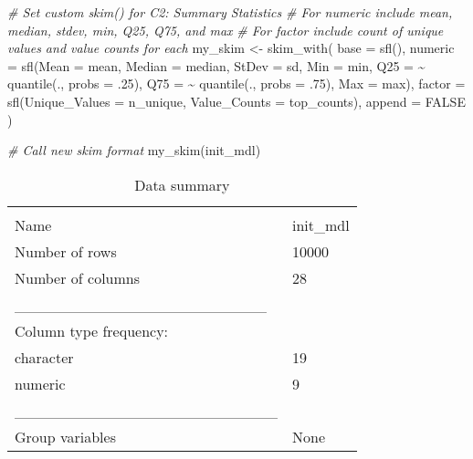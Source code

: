 \documentclass[
]{article}
\newenvironment{Shaded}{\begin{snugshade}}{\end{snugshade}}
\newcommand{\AttributeTok}[1]{\textcolor[rgb]{0.77,0.63,0.00}{#1}}
\newcommand{\CommentTok}[1]{\textcolor[rgb]{0.56,0.35,0.01}{\textit{#1}}}
\newcommand{\ConstantTok}[1]{\textcolor[rgb]{0.00,0.00,0.00}{#1}}
\newcommand{\DecValTok}[1]{\textcolor[rgb]{0.00,0.00,0.81}{#1}}
\newcommand{\FunctionTok}[1]{\textcolor[rgb]{0.00,0.00,0.00}{#1}}
\newcommand{\NormalTok}[1]{#1}
\newcommand{\OtherTok}[1]{\textcolor[rgb]{0.56,0.35,0.01}{#1}}
\newcommand{\SpecialCharTok}[1]{\textcolor[rgb]{0.00,0.00,0.00}{#1}}
\begin{document}
\begin{Shaded}
\begin{Highlighting}[]
\CommentTok{\# Set custom skim() for C2: Summary Statistics}
\CommentTok{\# For numeric include mean, median, stdev, min, Q25, Q75, and max}
\CommentTok{\# For factor include count of unique values and value counts for each}
\NormalTok{my\_skim }\OtherTok{\textless{}{-}} \FunctionTok{skim\_with}\NormalTok{(}
  \AttributeTok{base =} \FunctionTok{sfl}\NormalTok{(),}
  \AttributeTok{numeric =} \FunctionTok{sfl}\NormalTok{(}\AttributeTok{Mean =}\NormalTok{ mean,}
                \AttributeTok{Median =}\NormalTok{ median,}
                \AttributeTok{StDev =}\NormalTok{ sd,}
                \AttributeTok{Min =}\NormalTok{ min,}
                \AttributeTok{Q25 =} \SpecialCharTok{\textasciitilde{}} \FunctionTok{quantile}\NormalTok{(., }\AttributeTok{probs =}\NormalTok{ .}\DecValTok{25}\NormalTok{),}
                \AttributeTok{Q75 =} \SpecialCharTok{\textasciitilde{}} \FunctionTok{quantile}\NormalTok{(., }\AttributeTok{probs =}\NormalTok{ .}\DecValTok{75}\NormalTok{),}
                \AttributeTok{Max =}\NormalTok{ max),}
  \AttributeTok{factor =} \FunctionTok{sfl}\NormalTok{(}\AttributeTok{Unique\_Values =}\NormalTok{ n\_unique,}
               \AttributeTok{Value\_Counts =}\NormalTok{ top\_counts),}
  \AttributeTok{append =} \ConstantTok{FALSE}
\NormalTok{)}

\CommentTok{\# Call new skim format}
\FunctionTok{my\_skim}\NormalTok{(init\_mdl)}
\end{Highlighting}
\end{Shaded}

\begin{longtable}[]{@{}ll@{}}
\caption{Data summary}\tabularnewline
\toprule
& \\
\midrule
\endfirsthead
\toprule
& \\
\midrule
\endhead
Name & init\_mdl \\
Number of rows & 10000 \\
Number of columns & 28 \\
\_\_\_\_\_\_\_\_\_\_\_\_\_\_\_\_\_\_\_\_\_\_\_ & \\
Column type frequency: & \\
character & 19 \\
numeric & 9 \\
\_\_\_\_\_\_\_\_\_\_\_\_\_\_\_\_\_\_\_\_\_\_\_\_ & \\
Group variables & None \\
\bottomrule
\end{longtable}
\end{document}
